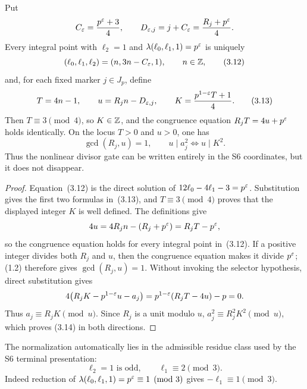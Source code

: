 \begin{corollary}
Put
\[
 C_\varepsilon=\frac{p^\varepsilon+3}{4},
 \qquad D_{\varepsilon,j}=j+C_\varepsilon=\frac{R_j+p^\varepsilon}{4}.
\]
Every integral point with \(\ell_2=1\) and
\(\lambda(\ell_0,\ell_1,1)=p^\varepsilon\) is uniquely
\begin{equation}
 (\ell_0,\ell_1,\ell_2)=(n,3n-C_\varepsilon,1),\qquad n\in\mathbb Z,      \tag{3.12}
\end{equation}
and, for each fixed marker \(j\in J_p\), define
\begin{equation}
 T=4n-1,
 \qquad u=R_jn-D_{\varepsilon,j},
 \qquad K=\frac{p^{1-\varepsilon}T+1}{4}.                          \tag{3.13}
\end{equation}
Then \(T\equiv3\pmod4\), so \(K\in\mathbb Z\), and the congruence equation
\(R_jT=4u+p^\varepsilon\) holds identically.  On the locus \(T>0\) and
\(u>0\), one has
\begin{equation}
 \gcd(R_j,u)=1,
 \qquad
 u\mid a_j^2\Longleftrightarrow u\mid K^2.                  \tag{3.14}
\end{equation}
Thus the nonlinear divisor gate can be written entirely in the S6
coordinates, but it does not disappear.
\end{corollary}

\begin{proof}
Equation~(3.12) is the direct solution of
\(12\ell_0-4\ell_1-3=p^\varepsilon\).  Substitution gives the first two
formulas in~(3.13), and \(T\equiv3\pmod4\) proves that the displayed
integer \(K\) is well defined.  The definitions give
\[
 4u=4R_jn-(R_j+p^\varepsilon)=R_jT-p^\varepsilon,
\]
so the congruence equation holds for every integral point in~(3.12).
If a positive integer divides both \(R_j\) and \(u\), then the congruence
equation makes it divide \(p^\varepsilon\); (1.2) therefore gives
\(\gcd(R_j,u)=1\).  Without invoking the selector hypothesis, direct
substitution gives
\[
 4\bigl(R_jK-p^{1-\varepsilon}u-a_j\bigr)
 =p^{1-\varepsilon}(R_jT-4u)-p=0.
\]
Thus \(a_j\equiv R_jK\pmod u\).  Since \(R_j\) is a unit modulo \(u\),
\(a_j^2\equiv R_j^2K^2\pmod u\), which proves (3.14) in both directions.
\end{proof}

The normalization automatically lies in the admissible residue class used by
the S6 terminal presentation:
\begin{equation}
 \ell_2=1\text{ is odd},
 \qquad \ell_1\equiv2\pmod3.                                \tag{3.15}
\end{equation}
Indeed reduction of \(\lambda(\ell_0,\ell_1,1)=p^\varepsilon\equiv1\pmod3\)
gives \(-\ell_1\equiv1\pmod3\).

